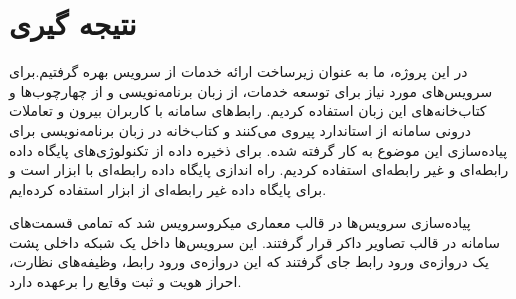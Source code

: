 \section{نتیجه گیری}

در این پروژه، ما به عنوان زیرساخت ارائه خدمات  از سرویس  بهره گرفتیم.برای سرویس‌های مورد نیاز برای توسعه خدمات، از زبان برنامه‌نویسی  و از چهارچوب‌ها و کتاب‌خانه‌های این زبان استفاده کردیم. رابط‌های سامانه با کاربران بیرون و تعاملات درونی سامانه از استاندارد  پیروی می‌کنند و کتاب‌خانه  در زبان برنامه‌نویسی  برای پیاده‌سازی این موضوع به کار گرفته شده. برای ذخیره داده از تکنولوژی‌های پایگاه داده رابطه‌ای و غیر رابطه‌ای استفاده کردیم. راه اندازی پایگاه داده رابطه‌ای با ابزار  است و برای پایگاه داده غیر رابطه‌ای از ابزار  استفاده کرده‌ایم.

پیاده‌سازی سرویس‌ها در قالب معماری میکروسرویس شد که تمامی قسمت‌های سامانه در قالب تصاویر داکر قرار گرفتند. این سرویس‌ها داخل یک شبکه داخلی پشت یک ‌دروازه‌ی ورود رابط جای گرفتند که این ‌دروازه‌ی ورود رابط، وظیفه‌های نظارت، احراز هویت و ثبت وقایع را برعهده دارد.